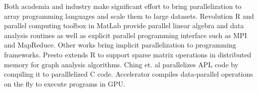 Both academia and industry make significant effort to bring parallelization to
array programming languages and scale them to large datasets. Revolution R
\cite{rre} and parallel computing toolbox in MatLab \cite{matlab} provide
parallel linear algebra and data analysis routines as well as explicit
parallel programming interface such as MPI and MapReduce. Other works bring
implicit parallelization to programming frameworks. Presto \cite{presto}
extends R to support sparse matrix operations in distributed memory for graph
analysis algorithms. Ching et. al \cite{Ching12} parallelizes APL code by
compiling it to paralllelized C code. Accelerator \cite{accelerator} compiles
data-parallel operations on the fly to execute programs in GPU.
